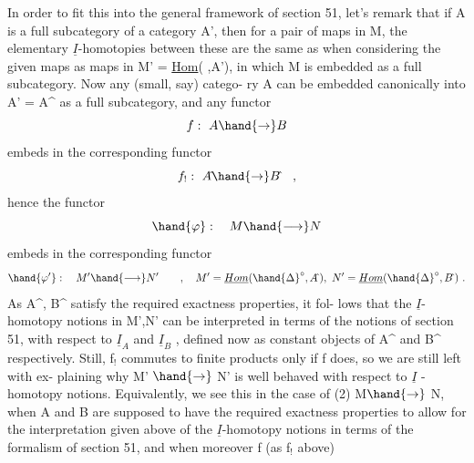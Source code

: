 In order to fit this into the general framework of section 51, 
let's remark that if A is a full subcategory of a category A', then for
a pair of maps in M, the elementary $\underline{I}$-homotopies between these are the
same as when considering the given maps as maps in M' = \uline{Hom}(\hand{$\Delta$} ,A'), in
which M is embedded as a full subcategory. Now any (small, say) catego-%
ry A can be embedded canonically into A' = A\^{} as a full subcategory,
and any functor 
\[ f:\ A \hand{\to} B \]
embeds in the corresponding functor
\[ f_{!} :\ A\hat{} \hand{\to} B\hat{} \quad , \]
hence the functor
\[ \hand{\varphi}:\quad M \hand{\longrightarrow} N \]
embeds in the corresponding functor
\[ \hand{\varphi'}:\quad M' \hand{\longrightarrow} N' \qquad , \quad M' = \underline{Hom}(\hand{\Delta}^{\circ},A\hat{}\,), \ N' = \underline{Hom}(\hand{\Delta}^{\circ},B\hat{}\,) \ . \]
 As A\^{}, B\^{} satisfy the required exactness properties, it fol-%
lows that the $\underline{I}$-homotopy notions in M',N' can be interpreted in terms of
the notions of section 51, with respect to $\underline{I}_A$ and $\underline{I}_B$ , 
defined now as  constant objects of A\^{} and B\^{} respectively. Still, f$_{!}$
commutes to finite products only if f does, so we are still left with ex-%
plaining why M' $\hand{\to}$ N' is well behaved with respect to $\underline{I}$ - homotopy
notions. Equivalently, we   see this in the case of (2) M$\hand{\to}$ N,
when A and B are supposed to have the required exactness properties to
allow for the interpretation given above of the $\underline{I}$-homotopy notions in
terms of the formalism of section 51, and when moreover f (as f$_{!}$ above)

